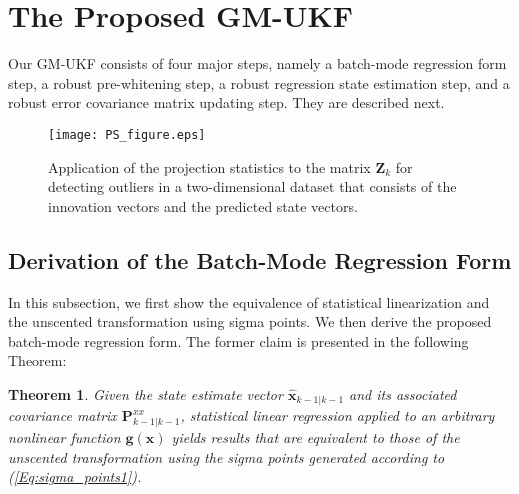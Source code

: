 \documentclass[10pt]{IEEEtran}
\newtheorem{theorem}{Theorem}
\begin{document}
\section{The Proposed GM-UKF}
Our GM-UKF consists of four major steps, namely a batch-mode regression form step, a robust pre-whitening step, a robust regression state estimation step, and a robust error covariance matrix updating step. They are described next.
\begin{figure*}
\centering
\texttt{[image: PS\_figure.eps]}
\caption{Application of the projection statistics to the matrix $\bm{Z}_k$ for detecting outliers in a two-dimensional dataset that consists of the innovation vectors and the predicted state vectors.}
\label{Fig.PS}
\end{figure*}
\vspace{-0.3cm}
\subsection{Derivation of the Batch-Mode Regression Form}
In this subsection, we first show the equivalence of statistical linearization and the unscented transformation using sigma points. We then derive the proposed batch-mode regression form. The former claim is presented in the following Theorem:
\begin{theorem}
Given the state estimate vector ${\bm{\widehat x}_{k - 1\left| {k - 1} \right.}}$ and its associated covariance matrix ${\bm{P} _{k - 1\left| {k - 1} \right.}^{xx}}$, statistical linear regression applied to an arbitrary nonlinear function $\bm{g}(\bm{x})$ yields results that are equivalent to those of the unscented transformation using the sigma points generated according to (\ref{Eq:sigma_points1}).
\end{theorem}
\end{document}

